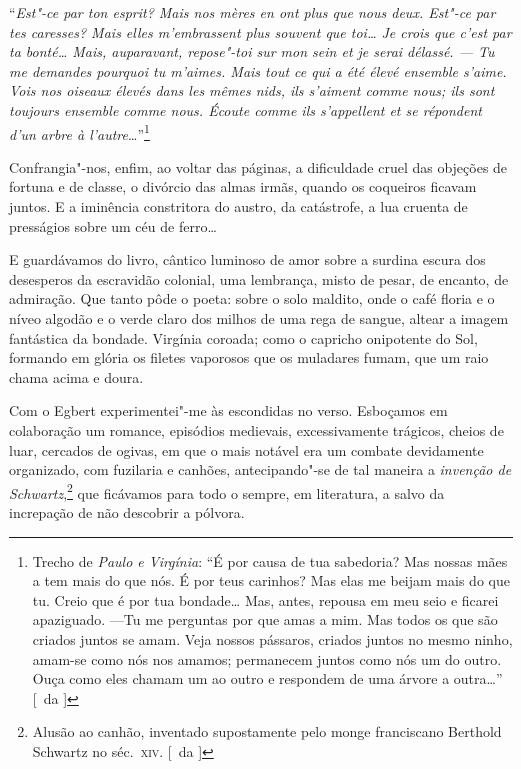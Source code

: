 ``\textit{Est"-ce par ton esprit? Mais
nos mères en ont plus que nous deux. Est"-ce par tes caresses? Mais
elles m'embrassent plus souvent que toi\ldots{} Je crois que c'est par ta
bonté\ldots{} Mais, auparavant, repose"-toi sur mon sein et je serai
délassé. --- Tu me demandes pourquoi tu m'aimes. Mais tout ce qui a été
élevé ensemble s'aime. Vois nos oiseaux élevés dans les mêmes nids, ils
s'aiment comme nous; ils sont toujours ensemble comme nous. Écoute
comme ils s'appellent et se répondent d'un arbre à l'autre}\ldots{}''\footnote{ Trecho 
de \textit{Paulo e Virgínia}: ``É por causa de tua sabedoria? Mas nossas mães a tem 
mais do que nós. É por teus carinhos? 
Mas elas me beijam mais do que tu. Creio que é por tua bondade\ldots{} 
Mas, antes, repousa em meu seio e ficarei apaziguado. 
---Tu me perguntas por que amas a mim. Mas todos os que são criados juntos se amam. Veja 
nossos pássaros, criados juntos no mesmo ninho, amam-se como nós nos amamos; 
permanecem juntos como nós um do outro. Ouça como eles chamam um ao outro e 
respondem de uma árvore a outra\ldots{}'' [~da ]}

Confrangia"-nos, enfim, ao voltar das páginas, a dificuldade cruel das
objeções de fortuna e de classe, o divórcio das almas irmãs, quando os
coqueiros ficavam juntos. E a iminência constritora do austro, da
catástrofe, a lua cruenta de presságios sobre um céu de ferro\ldots{} 

E guardávamos do livro, cântico luminoso de amor sobre a surdina escura
dos desesperos da escravidão colonial, uma lembrança, misto de pesar,
de encanto, de admiração. Que tanto pôde o poeta: sobre o solo maldito,
onde o café floria e o níveo algodão e o verde claro dos milhos de uma
rega de sangue, altear a imagem fantástica da bondade. Virgínia
coroada; como o capricho onipotente do Sol, formando em glória os
filetes vaporosos que os muladares fumam, que um raio chama acima e
doura. 

Com o Egbert experimentei"-me às escondidas no verso. Esboçamos
em colaboração um romance, episódios medievais, excessivamente
trágicos, cheios de luar, cercados de ogivas, em que o mais notável era
um combate devidamente organizado, com fuzilaria e canhões,
antecipando"-se de tal maneira a \textit{invenção de Schwartz},\footnote{ Alusão ao canhão, 
inventado supostamente pelo monge franciscano Berthold Schwartz no séc.~\textsc{xiv}. [~da ]} 
que ficávamos para todo o sempre, em literatura, a salvo da increpação de não
descobrir a pólvora. 

